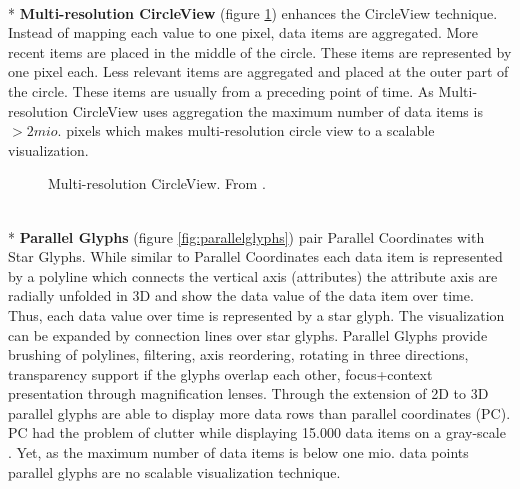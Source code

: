 \\*
\textbf{Multi-resolution CircleView} (figure \ref{fig:multiresolutioncircleview}) enhances the CircleView technique. Instead of mapping each value to one pixel, data items are aggregated. More recent items are placed in the middle of the circle. These items are represented by one pixel each. Less relevant items are aggregated and placed at the outer part of the circle. These items are usually from a preceding point of time. As Multi-resolution CircleView uses aggregation the maximum number of data items is $> 2mio.$ pixels which makes multi-resolution circle view to a scalable visualization.
\begin{figure}[H]
    \centering
    \caption{Multi-resolution CircleView. From  \cite{Keim2005}.}
    \label{fig:multiresolutioncircleview}
\end{figure}
\\*
\textbf{Parallel Glyphs} (figure \ref{fig:parallelglyphs}) pair Parallel Coordinates with Star Glyphs. While similar to Parallel Coordinates each data item is represented by a polyline which connects the vertical axis (attributes) the attribute axis are radially unfolded in 3D and show the data value of the data item over time. Thus, each data value over time is represented by a star glyph. The visualization can be expanded by connection lines over star glyphs. Parallel Glyphs provide brushing of polylines, filtering, axis reordering, rotating in three directions, transparency support if the glyphs overlap each other, focus+context presentation through magnification lenses. Through the extension of 2D to 3D parallel glyphs are able to display more data rows than parallel coordinates (PC). PC had the problem of clutter while displaying 15.000 data items on a gray-scale  \cite{Keim2000Tut}. Yet, as the maximum number of data items is below one mio. data points parallel glyphs are no scalable visualization technique. 

